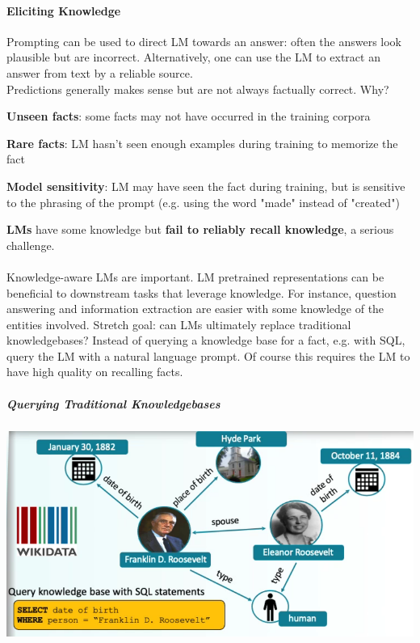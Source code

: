 \documentclass[10pt]{report}
\begin{document}
\paragraph{Eliciting Knowledge} Prompting can be used to direct LM towards an answer: often the answers look plausible but are incorrect. Alternatively, one can use the LM to extract an answer from text by a reliable source.\\
Predictions generally makes sense but are not always factually correct. Why?\begin{list}{}{}
	\item \textbf{Unseen facts}: some facts may not have occurred in the training corpora
	\item \textbf{Rare facts}: LM hasn't seen enough examples during training to memorize the fact
	\item \textbf{Model sensitivity}: LM may have seen the fact during training, but is sensitive to the phrasing of the prompt (e.g. using the word "made" instead of "created")
\end{list}
\textbf{LMs} have some knowledge but \textbf{fail to reliably recall knowledge}, a serious challenge.\\\\
Knowledge-aware LMs are important. LM pretrained representations can be beneficial to downstream tasks that leverage knowledge. For instance, question answering and information extraction are easier with some knowledge of the entities involved. Stretch goal: can LMs ultimately replace traditional knowledgebases? Instead of querying a knowledge base for a fact, e.g. with SQL, query the LM with a natural language prompt. Of course this requires the LM to have high quality on recalling facts.
\subparagraph{Querying Traditional Knowledgebases}
\begin{center}
	\includegraphics[scale=0.33]{104.png}
\end{center}
\end{document}
